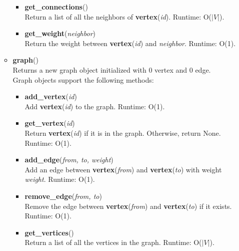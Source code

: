 \documentclass{article}
\begin{document}
\begin{itemize}
\begin{tcolorbox}
\begin{itemize}
\begin{itemize}
\item \textbf{get\_connections}()\\
Return a list of all the neighbors of \textbf{vertex}(\textit{id}). Runtime: O($|V|$).

\item \textbf{get\_weight}(\textit{neighbor})\\
Return the weight between \textbf{vertex}(\textit{id}) and  \textit{neighbor}. Runtime: O(1).

\end{itemize}


\item \textbf{graph}()\\
Returns a new graph object initialized with 0 vertex and 0 edge.\\
Graph objects support the following methods:
\begin{itemize}
\item \textbf{add\_vertex}(\textit{id})\\
Add \textbf{vertex}(\textit{id}) to the graph. Runtime: O(1).

\item \textbf{get\_vertex}(\textit{id})\\
Return \textbf{vertex}(\textit{id}) if it is in the graph. Otherwise, return None. Runtime: O(1).

\item \textbf{add\_edge}(\textit{from, to, weight})\\
Add an edge between \textbf{vertex}(\textit{from}) and \textbf{vertex}(\textit{to}) with weight \textit{weight}. Runtime: O(1).

\item \textbf{remove\_edge}(\textit{from, to}) \\
Remove the edge between \textbf{vertex}(\textit{from}) and \textbf{vertex}(\textit{to}) if it exists. Runtime: O(1).

\item \textbf{get\_vertices}() \\
Return a list of all the vertices in the graph. Runtime: O($|V|$).
\end{itemize}

\end{itemize}
\end{tcolorbox}


\end{itemize}
\end{document}
